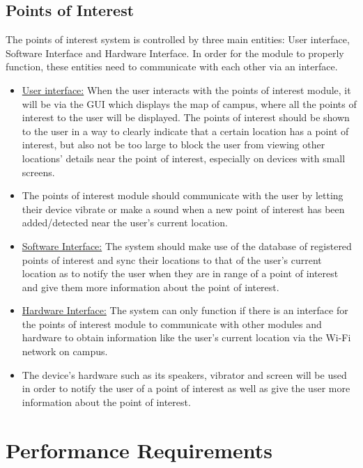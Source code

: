 \documentclass[runningheads,a4paper]{article}
\begin{document}
\subsection{Points of Interest}
The points of interest system is controlled by three main entities: User interface, Software Interface and Hardware Interface. In order for the module to properly function, these entities need to communicate with each other via an interface.
\begin{itemize}
\item \underline{User interface:} 
When the user interacts with the points of interest module, it will be via the GUI which displays the map of campus, where all the points of interest to the user will be displayed. The points of interest should be shown to the user in a way to clearly indicate that a certain location has a point of interest, but also not be too large to block the user from viewing other locations' details near the point of interest, especially on devices with small screens. 

\item The points of interest module should communicate with the user by letting their device vibrate or make a sound when a new point of interest has been added/detected near the user's current location.

\item \underline{Software Interface:}
The system should make use of the database of registered points of interest and sync their locations to that of the user's current location as to notify the user when they are in range of a point of interest and give them more information about the point of interest.

\item \underline{Hardware Interface:}
The system can only function if there is an interface for the points of interest module to communicate with other modules and hardware to obtain information like the user's current location via the Wi-Fi network on campus.

\item The device's hardware such as its speakers, vibrator and screen will be used in order to notify the user of a point of interest as well as give the user more information about the point of interest.


\end{itemize}


\section{Performance Requirements}
\end{document}
